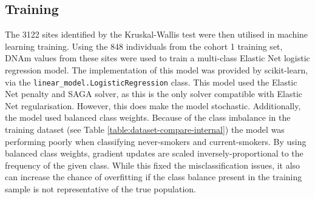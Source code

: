 \documentclass{article} %
\begin{document}

\subsection{Training} \label{sec:training}

The \num{3122} sites identified by the Kruskal-Wallis test were then utilised in machine learning training. Using the 848 individuals from the cohort 1 training set, DNAm values from these sites were used to train a multi-class Elastic Net logistic regression model. The implementation of this model was provided by scikit-learn, via the \verb|linear_model.LogisticRegression| class. This model used the Elastic Net penalty and SAGA solver, as this is the only solver compatible with Elastic Net regularisation. However, this does make the model stochastic. Additionally, the model used balanced class weights. Because of the class imbalance in the training dataset (see Table \ref{table:dataset-compare-internal}) the model was performing poorly when classifying never-smokers and current-smokers. By using balanced class weights, gradient updates are scaled inversely-proportional to the frequency of the given class. While this fixed the misclassification issues, it also can increase the chance of overfitting if the class balance present in the training sample is not representative of the true population.
\end{document}
